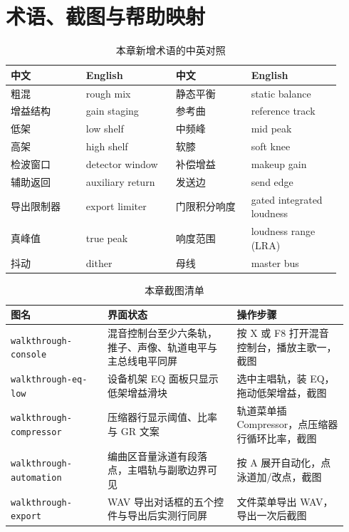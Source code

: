 \section{术语、截图与帮助映射}

\begin{table}[htbp]
\centering
\small
\begin{tabular}{@{}p{0.21\linewidth}p{0.25\linewidth}p{0.21\linewidth}p{0.25\linewidth}@{}}
\hline
中文 & English & 中文 & English \\
\hline
粗混 & rough mix & 静态平衡 & static balance \\
增益结构 & gain staging & 参考曲 & reference track \\
低架 & low shelf & 中频峰 & mid peak \\
高架 & high shelf & 软膝 & soft knee \\
检波窗口 & detector window & 补偿增益 & makeup gain \\
辅助返回 & auxiliary return & 发送边 & send edge \\
导出限制器 & export limiter & 门限积分响度 & gated integrated loudness \\
真峰值 & true peak & 响度范围 & loudness range (LRA) \\
抖动 & dither & 母线 & master bus \\
\hline
\end{tabular}
\caption{本章新增术语的中英对照}
\label{tab:walk-terms}
\end{table}

\begin{table}[htbp]
\centering
\small
\begin{tabular}{@{}p{0.27\linewidth}p{0.36\linewidth}p{0.31\linewidth}@{}}
\hline
图名 & 界面状态 & 操作步骤 \\
\hline
\texttt{walkthrough-console} & 混音控制台至少六条轨，推子、声像、轨道电平与主总线电平同屏 & 按 X 或 F8 打开混音控制台，播放主歌一，截图 \\
\texttt{walkthrough-eq-low} & 设备机架 EQ 面板只显示低架增益滑块 & 选中主唱轨，装 EQ，拖动低架增益，截图 \\
\texttt{walkthrough-\allowbreak compressor} & 压缩器行显示阈值、比率与 GR 文案 & 轨道菜单插 Compressor，点压缩器行循环比率，截图 \\
\texttt{walkthrough-\allowbreak automation} & 编曲区音量泳道有段落点，主唱轨与副歌边界可见 & 按 A 展开自动化，点泳道加/改点，截图 \\
\texttt{walkthrough-export} & WAV 导出对话框的五个控件与导出后实测行同屏 & 文件菜单导出 WAV，导出一次后截图 \\
\hline
\end{tabular}
\caption{本章截图清单}
\label{tab:walk-screens}
\end{table}

